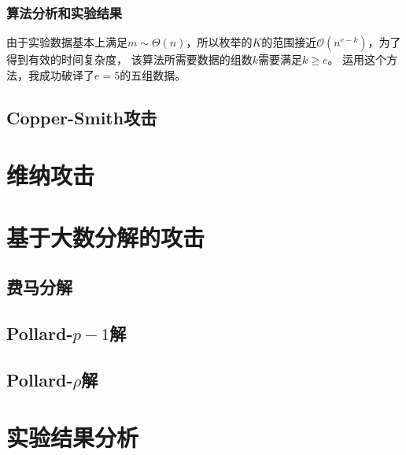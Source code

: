 \documentclass{ctexart}
\begin{document}
\subsubsection{算法分析和实验结果}
由于实验数据基本上满足$m\sim \Theta(n)$，所以枚举的$K$的范围接近$\mathcal{O}(n^{e-k})$，为了得到有效的时间复杂度，
该算法所需要数据的组数$k$需要满足$k\geqslant e $。
运用这个方法，我成功破译了$e=5$的五组数据。
\subsection{Copper-Smith攻击}

\section{维纳攻击}

\section{基于大数分解的攻击}

\subsection{费马分解}

\subsection{Pollard-\texorpdfstring{$p-1$}分解}

\subsection{Pollard-\texorpdfstring{$\rho$}分解}

\section{实验结果分析}
\end{document}
